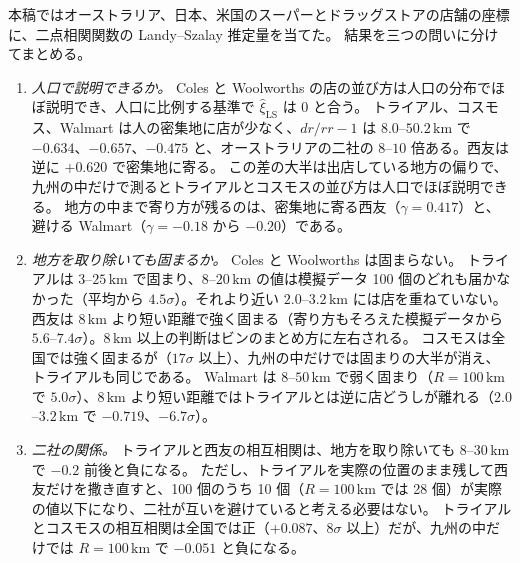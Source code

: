 \documentclass[a4paper,11pt]{ltjsarticle}
\begin{document}
本稿ではオーストラリア、日本、米国のスーパーとドラッグストアの店舗の座標に、二点相関関数の Landy--Szalay 推定量を当てた。
結果を三つの問いに分けてまとめる。
\begin{enumerate}
  \item \emph{人口で説明できるか。}
    Coles と Woolworths の店の並び方は人口の分布でほぼ説明でき、人口に比例する基準で $\hat\xi_{\mathrm{LS}}$ は $0$ と合う。
    トライアル、コスモス、Walmart は人の密集地に店が少なく、$dr/rr - 1$ は $8.0$--$50.2\,\mathrm{km}$ で $-0.634$、$-0.657$、$-0.475$ と、オーストラリアの二社の $8$--$10$ 倍ある。西友は逆に $+0.620$ で密集地に寄る。
    この差の大半は出店している地方の偏りで、九州の中だけで測るとトライアルとコスモスの並び方は人口でほぼ説明できる。
    地方の中まで寄り方が残るのは、密集地に寄る西友（$\gamma = 0.417$）と、避ける Walmart（$\gamma = -0.18$ から $-0.20$）である。
  \item \emph{地方を取り除いても固まるか。}
    Coles と Woolworths は固まらない。
    トライアルは $3$--$25\,\mathrm{km}$ で固まり、$8$--$20\,\mathrm{km}$ の値は模擬データ 100 個のどれも届かなかった（平均から $4.5\sigma$）。それより近い $2.0$--$3.2\,\mathrm{km}$ には店を重ねていない。
    西友は $8\,\mathrm{km}$ より短い距離で強く固まる（寄り方もそろえた模擬データから $5.6$--$7.4\sigma$）。$8\,\mathrm{km}$ 以上の判断はビンのまとめ方に左右される。
    コスモスは全国では強く固まるが（$17\sigma$ 以上）、九州の中だけでは固まりの大半が消え、トライアルも同じである。
    Walmart は $8$--$50\,\mathrm{km}$ で弱く固まり（$R = 100\,\mathrm{km}$ で $5.0\sigma$）、$8\,\mathrm{km}$ より短い距離ではトライアルとは逆に店どうしが離れる（$2.0$--$3.2\,\mathrm{km}$ で $-0.719$、$-6.7\sigma$）。
  \item \emph{二社の関係。}
    トライアルと西友の相互相関は、地方を取り除いても $8$--$30\,\mathrm{km}$ で $-0.2$ 前後と負になる。
    ただし、トライアルを実際の位置のまま残して西友だけを撒き直すと、100 個のうち 10 個（$R = 100\,\mathrm{km}$ では 28 個）が実際の値以下になり、二社が互いを避けていると考える必要はない。
    トライアルとコスモスの相互相関は全国では正（$+0.087$、$8\sigma$ 以上）だが、九州の中だけでは $R = 100\,\mathrm{km}$ で $-0.051$ と負になる。
\end{enumerate}
\end{document}
